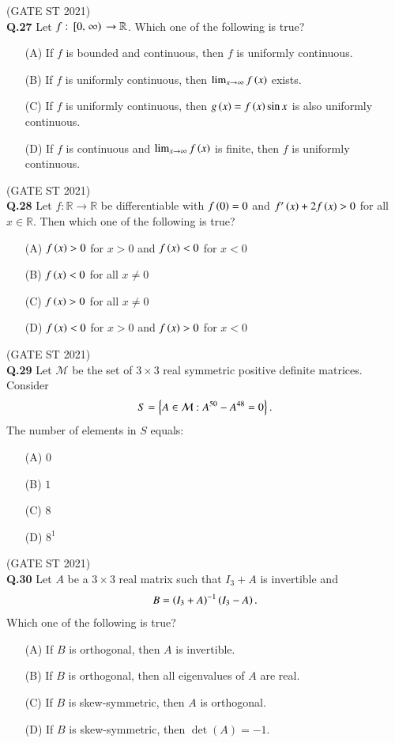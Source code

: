 \documentclass[journal,12pt,onecolumn]{IEEEtran}
\theoremstyle{remark}
\begin{document}
\hfill (GATE ST 2021) \\

\textbf{Q.27}
Let $f: {}\left[0, \left.\infty\right)\right. \to \mathbb{R}$. Which one of the following is true?
\begin{enumerate}
\item[(A)] If $f$ is bounded and continuous, then $f$ is uniformly continuous.
\item[(B)] If $f$ is uniformly continuous, then $\lim_{x \to \infty} f\left(x\right)$ exists.
\item[(C)] If $f$ is uniformly continuous, then $g\left(x\right) = f\left(x\right) \sin x$ is also uniformly continuous.
\item[(D)] If $f$ is continuous and $\lim_{x \to \infty} f\left(x\right)$ is finite, then $f$ is uniformly continuous.
\end{enumerate}

\hfill (GATE ST 2021) \\
\textbf{Q.28}
Let $f: \mathbb{R} \to \mathbb{R}$ be differentiable with $f\left(0\right) = 0$ and $f'\left(x\right) + 2f\left(x\right) > 0$ for all $x \in \mathbb{R}$. Then which one of the following is true?
\begin{enumerate}
\item[(A)] $f\left(x\right) > 0$ for $x > 0$ and $f\left(x\right) < 0$ for $x < 0$
\item[(B)] $f\left(x \right)< 0$ for all $x \neq 0$
\item[(C)] $f\left(x\right) > 0$ for all $x \neq 0$
\item[(D)] $f\left(x\right) < 0$ for $x > 0$ and $f\left(x\right) > 0$ for $x < 0$
\end{enumerate}

\hfill (GATE ST 2021) \\
\textbf{Q.29}
Let $\mathcal{M}$ be the set of $3\times 3$ real symmetric positive definite matrices. Consider  
\[
S = \left\{ A \in \mathcal{M} : A^{50} - A^{48} = 0 \right\}.
\]
The number of elements in $S$ equals:
\begin{enumerate}
\item[(A)] $0$
\item[(B)] $1$
\item[(C)] $8$
\item[(D)] $8^1$
\end{enumerate}

\hfill (GATE ST 2021) \\

\textbf{Q.30}
Let $A$ be a $3\times 3$ real matrix such that $I_3 + A$ is invertible and
\[
B = \left(I_3 + A\right)^{-1}\left(I_3 - A\right).
\]
Which one of the following is true?
\begin{enumerate}
\item[(A)] If $B$ is orthogonal, then $A$ is invertible.
\item[(B)] If $B$ is orthogonal, then all eigenvalues of $A$ are real.
\item[(C)] If $B$ is skew-symmetric, then $A$ is orthogonal.
\item[(D)] If $B$ is skew-symmetric, then $\det(A) = -1$.
\end{enumerate}
\end{document}
